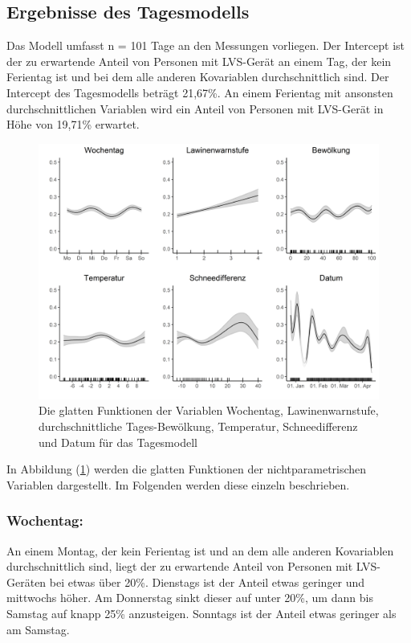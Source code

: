 \documentclass[12pt]{scrreprt}
\begin{document}
\subsection{Ergebnisse des Tagesmodells}
Das Modell umfasst n = 101 Tage an den Messungen vorliegen. 
Der Intercept ist der zu erwartende Anteil von Personen mit LVS-Gerät an einem Tag, der kein Ferientag ist und bei dem alle anderen Kovariablen durchschnittlich sind. Der Intercept des Tagesmodells beträgt 21,67\%. An einem Ferientag mit ansonsten durchschnittlichen Variablen wird ein Anteil von Personen mit LVS-Gerät in Höhe von 19,71\% erwartet. \\
\begin{figure}[H]
	\centering
	\includegraphics[width=\linewidth]{plots/smooth_day_model}
	\caption{ Die glatten Funktionen der Variablen Wochentag, Lawinenwarnstufe, durchschnittliche Tages-Bewölkung, Temperatur, Schneedifferenz und Datum für das Tagesmodell }
	\label{pic:smooth_day_model}	
\end{figure}
\noindent In Abbildung (\ref{pic:smooth_day_model}) werden die glatten Funktionen der nichtparametrischen Variablen dargestellt. Im Folgenden werden diese einzeln beschrieben.
\subsubsection*{Wochentag:}
An einem Montag, der kein Ferientag ist und an dem alle anderen Kovariablen durchschnittlich sind, liegt der zu erwartende Anteil von Personen mit LVS-Geräten bei etwas über 20\%. Dienstags ist der Anteil etwas geringer und mittwochs höher. Am Donnerstag sinkt dieser auf unter 20\%, um dann bis Samstag auf knapp 25\% anzusteigen. Sonntags ist der Anteil etwas geringer als am Samstag.
\end{document}
